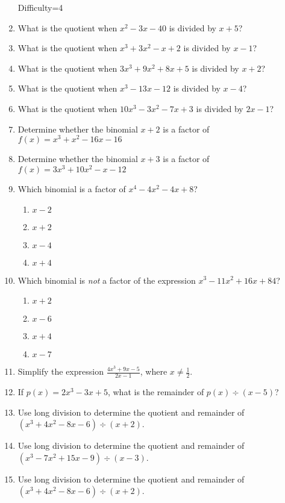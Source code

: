 \documentclass[12pt, oneside]{article}
\begin{document}
\begin{enumerate}
Difficulty=4
\item What is the quotient when $x^2-3x-40$ is divided by $x + 5$?
\item What is the quotient when $x^3+3x^2-x+2$ is divided by $x - 1$?
\item What is the quotient when $3x^3+9x^2+8x+5$ is divided by $x+2$?
\item What is the quotient when $x^3-13x-12$ is divided by $x - 4$?
\item What is the quotient when $10x^3-3x^2-7x+3$ is divided by $2x - 1$? %

\item Determine whether the binomial $x+2$ is a factor of $f(x)=x^3+x^2-16x-16$
\item Determine whether the binomial $x+3$ is a factor of $f(x)=3x^3+10x^2-x-12$

\item Which binomial is a factor of $x^4-4x^2-4x+8$?
\begin{enumerate}
    \item $x-2$
    \item $x+2$
    \item $x-4$
    \item $x+4$
\end{enumerate} %


\item Which binomial is \emph{not} a factor of the expression $x^3- 11x^2 +16x +84$?
\begin{enumerate}
    \item $x+2$
    \item $x-6$
    \item $x+4$
    \item $x-7$
\end{enumerate}

\item Simplify the expression $\displaystyle \frac{4x^3+9x-5}{2x-1}$, where $x \neq \frac{1}{2}$. %

\item If $p(x)=2x^3-3x+5$, what is the remainder of $p(x) \div (x-5)$? %

\item Use long division to determine the quotient and remainder of $(x^3+4x^2-8x-6) \div (x+2)$.
\item Use long division to determine the quotient and remainder of $(x^3-7x^2+15x-9) \div (x-3)$.
\item Use long division to determine the quotient and remainder of $(x^3+4x^2-8x-6) \div (x+2)$.


\end{enumerate}
\end{document}

